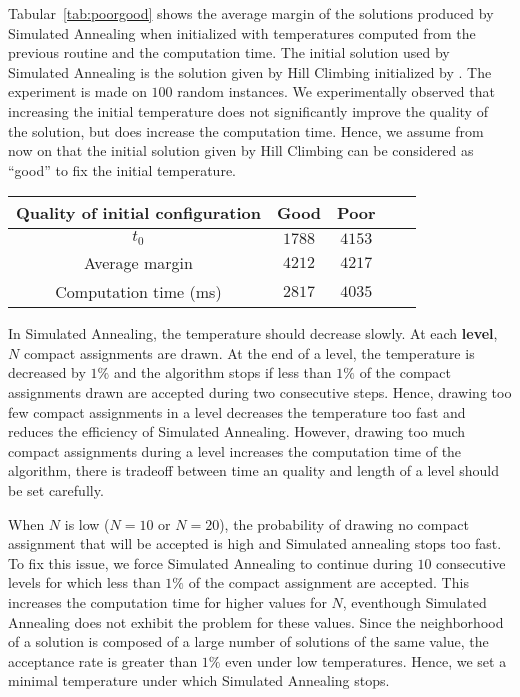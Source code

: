  Tabular~\ref{tab:poorgood} shows the average margin of the solutions produced by Simulated Annealing when initialized with temperatures computed from the previous routine and the computation time. The initial solution used by Simulated Annealing is the solution given by Hill Climbing initialized by \hybridgreedynormalized. The experiment is made on $100$ random instances.
  We experimentally observed that increasing the initial temperature does not significantly improve the quality of the solution, but does increase the computation time. Hence, we assume from now on that the initial solution given by Hill Climbing can be considered as ``good'' to fix the initial temperature.

\begin{center}
\begin{tabular}{ |c|c|c|c|c| }
\hline
 Quality of initial configuration & Good& Poor\\
    \hline
    $t_0$ & $1788$& $4153$\\
    \hline
    Average margin & $4212$ & $4217$ \\
        \hline
    Computation time (ms) &  $2817$&$4035$ \\
    \hline
    
 \end{tabular}
     \label{tab:poorgood}
 \end{center}

 
 In Simulated Annealing, the temperature should decrease slowly. At each \textbf{level}, $N$ compact assignments are drawn. At the end of a level, the temperature is decreased by $1\%$ and the algorithm stops if less than $1\%$ of the compact assignments drawn are accepted during two consecutive steps. Hence, drawing too few compact assignments in a level decreases the temperature too fast and reduces the efficiency of Simulated Annealing. However, drawing too much compact assignments during a level increases the computation time of the algorithm, there is tradeoff between time an quality and length of a level should be set carefully.


 When $N$ is low ($N=10$ or $N = 20$), the probability of drawing no compact assignment that will be accepted is high and Simulated annealing stops too fast. To fix this issue, we force Simulated Annealing to continue during $10$ consecutive levels for which less than $1\%$ of the compact assignment are accepted. This increases the computation time for higher values for $N$, eventhough Simulated Annealing does not exhibit the problem for these values. Since the neighborhood of a solution is composed of a large number of solutions of the same value, the acceptance rate is greater than $1\%$ even under low temperatures. Hence, we set a minimal temperature under which Simulated Annealing stops.

